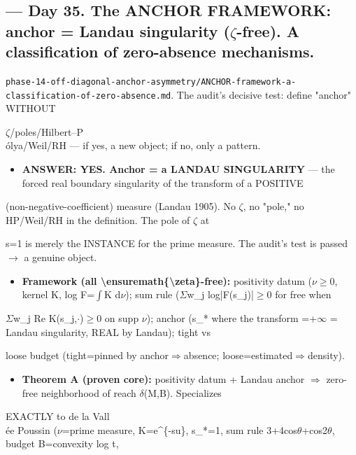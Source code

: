 \documentclass[10pt]{article}
\begin{document}
\subsection*{ --- Day 35. The ANCHOR FRAMEWORK: anchor = Landau singularity (\ensuremath{\zeta}-free). A classification of zero-absence mechanisms.}
\texttt{phase-14-off-diagonal-anchor-asymmetry/ANCHOR-framework-a-classification-of-zero-absence.md}. The audit's decisive test: define "anchor" WITHOUT\par
\ensuremath{\zeta}/poles/Hilbert--P\\\'olya/Weil/RH --- if yes, a new object; if no, only a pattern.\par
\begin{itemize}
\item \textbf{ANSWER: YES. Anchor = a LANDAU SINGULARITY} --- the forced real boundary singularity of the transform of a POSITIVE
\end{itemize}
  (non-negative-coefficient) measure (Landau 1905). No \ensuremath{\zeta}, no "pole," no HP/Weil/RH in the definition. The pole of \ensuremath{\zeta} at\par
  s=1 is merely the INSTANCE for the prime measure. The audit's test is passed \ensuremath{\to} a genuine object.\par
\begin{itemize}
\item \textbf{Framework (all \textbackslash{}ensuremath\{\textbackslash{}zeta\}-free):} positivity datum (\ensuremath{\nu}\ensuremath{\ge}0, kernel K, log F=\ensuremath{\int}K d\ensuremath{\nu}); sum rule (\ensuremath{\Sigma}w\_j log|F(s\_j)|\ensuremath{\ge}0 for free when
\end{itemize}
  \ensuremath{\Sigma}w\_j Re K(s\_j,\ensuremath{\cdot})\ensuremath{\ge}0 on supp \ensuremath{\nu}); anchor (s\_* where the transform =+\ensuremath{\infty} = Landau singularity, REAL by Landau); tight vs\par
  loose budget (tight=pinned by anchor\ensuremath{\Rightarrow}absence; loose=estimated\ensuremath{\Rightarrow}density).\par
\begin{itemize}
\item \textbf{Theorem A (proven core):} positivity datum + Landau anchor \ensuremath{\Rightarrow} zero-free neighborhood of reach \ensuremath{\delta}(M,B). Specializes
\end{itemize}
  EXACTLY to de la Vall\\\'ee Poussin (\ensuremath{\nu}=prime measure, K=e\textasciicircum{}\{-su\}, s\_*=1, sum rule 3+4cos\ensuremath{\theta}+cos2\ensuremath{\theta}, budget B=convexity log t,\par
\end{document}
